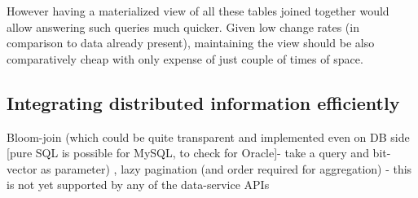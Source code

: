 However having a materialized view of all these tables joined together would allow answering such queries much quicker. Given low change rates (in comparison to data already present), maintaining the view should be also comparatively cheap with only expense of just couple of times of space.



\subsection{Integrating distributed information efficiently}
Bloom-join (which could be quite transparent and implemented even on DB side [pure SQL is possible for MySQL, to check for Oracle]- take a query and bit-vector as parameter) , lazy pagination (and order required for aggregation) - this is not yet supported by any of the data-service APIs


